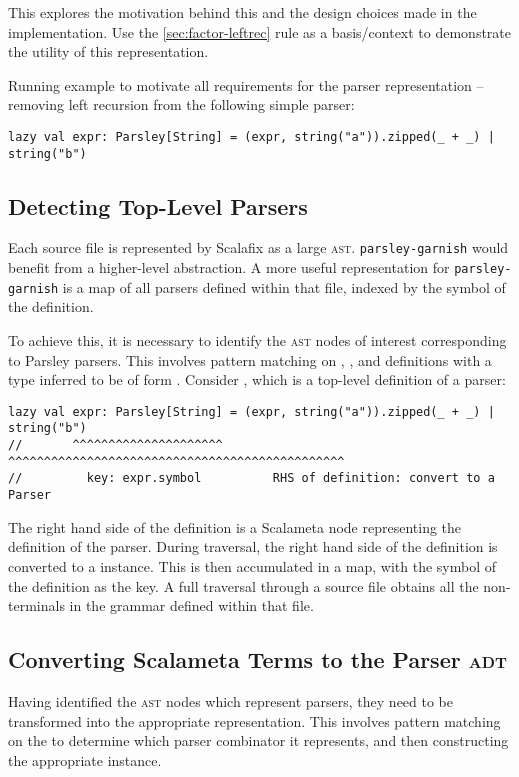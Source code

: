 \documentclass[../../main.tex]{subfiles}
\begin{document}
This  explores the motivation behind this and the design choices made in the implementation.
Use the \cref{sec:factor-leftrec} rule as a basis/context to demonstrate the utility of this representation.

Running example to motivate all requirements for the parser representation -- removing left recursion from the following simple parser:
\begin{verbatim}
lazy val expr: Parsley[String] = (expr, string("a")).zipped(_ + _) | string("b")
\end{verbatim}

\subsection{Detecting Top-Level Parsers}
Each source file is represented by Scalafix as a large \textsc{ast}.
\texttt{parsley-garnish} would benefit from a higher-level abstraction.
A more useful representation for \texttt{parsley-garnish} is a map of all parsers defined within that file, indexed by the symbol of the definition.

To achieve this, it is necessary to identify the \textsc{ast} nodes of interest corresponding to Parsley parsers.
This involves pattern matching on , , and  definitions with a type inferred to be of form .
Consider , which is a top-level definition of a parser:
\begin{verbatim}
lazy val expr: Parsley[String] = (expr, string("a")).zipped(_ + _) | string("b")
//       ^^^^^^^^^^^^^^^^^^^^^   ^^^^^^^^^^^^^^^^^^^^^^^^^^^^^^^^^^^^^^^^^^^^^^^
//         key: expr.symbol          RHS of definition: convert to a Parser
\end{verbatim}
The right hand side of the definition is a Scalameta  node representing the definition of the parser.
During traversal, the right hand side of the definition is converted to a \scala{Parser} instance.
This is then accumulated in a map, with the symbol of the definition as the key.
A full traversal through a source file obtains all the non-terminals in the grammar defined within that file.

\subsection{Converting Scalameta Terms to the Parser \textsc{adt}}
Having identified the \textsc{ast} nodes which represent parsers, they need to be transformed into the appropriate  representation.
This involves pattern matching on the \scala{Term} to determine which parser combinator it represents, and then constructing the appropriate  instance.
\end{document}
